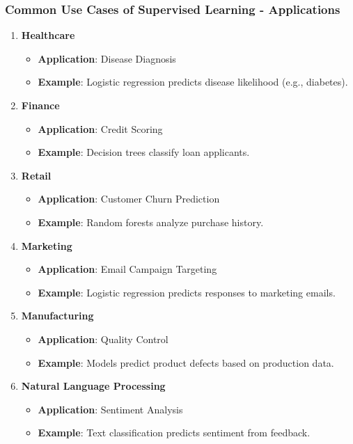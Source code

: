 \documentclass[aspectratio=169]{beamer}
\begin{document}
\begin{frame}[fragile]
    \frametitle{Common Use Cases of Supervised Learning - Applications}
    \begin{enumerate}
        \item \textbf{Healthcare}
            \begin{itemize}
                \item \textbf{Application}: Disease Diagnosis
                \item \textbf{Example}: Logistic regression predicts disease likelihood (e.g., diabetes).
            \end{itemize}
        \item \textbf{Finance}
            \begin{itemize}
                \item \textbf{Application}: Credit Scoring
                \item \textbf{Example}: Decision trees classify loan applicants.
            \end{itemize}
        \item \textbf{Retail}
            \begin{itemize}
                \item \textbf{Application}: Customer Churn Prediction
                \item \textbf{Example}: Random forests analyze purchase history.
            \end{itemize}
        \item \textbf{Marketing}
            \begin{itemize}
                \item \textbf{Application}: Email Campaign Targeting
                \item \textbf{Example}: Logistic regression predicts responses to marketing emails.
            \end{itemize}
        \item \textbf{Manufacturing}
            \begin{itemize}
                \item \textbf{Application}: Quality Control
                \item \textbf{Example}: Models predict product defects based on production data.
            \end{itemize}
        \item \textbf{Natural Language Processing}
            \begin{itemize}
                \item \textbf{Application}: Sentiment Analysis
                \item \textbf{Example}: Text classification predicts sentiment from feedback.
            \end{itemize}
    \end{enumerate}
\end{frame}
\end{document}
